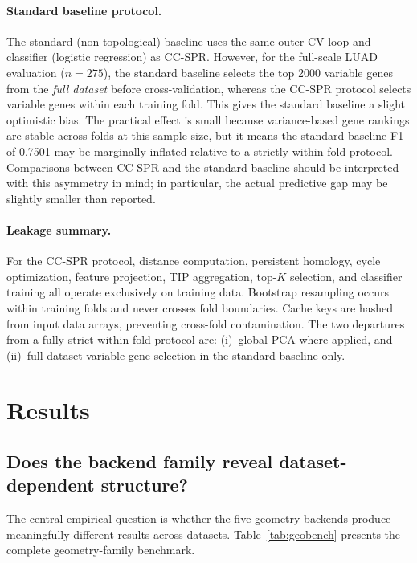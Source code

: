 \documentclass[11pt]{article}
\begin{document}
\paragraph{Standard baseline protocol.}
The standard (non-topological) baseline uses the same outer CV loop and classifier (logistic regression) as CC-SPR.
However, for the full-scale LUAD evaluation ($n = 275$), the standard baseline selects the top 2000 variable genes from the \emph{full dataset} before cross-validation, whereas the CC-SPR protocol selects variable genes within each training fold.
This gives the standard baseline a slight optimistic bias.
The practical effect is small because variance-based gene rankings are stable across folds at this sample size, but it means the standard baseline F1 of 0.7501 may be marginally inflated relative to a strictly within-fold protocol.
Comparisons between CC-SPR and the standard baseline should be interpreted with this asymmetry in mind; in particular, the actual predictive gap may be slightly smaller than reported.

\paragraph{Leakage summary.}
For the CC-SPR protocol, distance computation, persistent homology, cycle optimization, feature projection, TIP aggregation, top-$K$ selection, and classifier training all operate exclusively on training data.
Bootstrap resampling occurs within training folds and never crosses fold boundaries.
Cache keys are hashed from input data arrays, preventing cross-fold contamination.
The two departures from a fully strict within-fold protocol are: (i)~global PCA where applied, and (ii)~full-dataset variable-gene selection in the standard baseline only.

\section{Results}
\label{sec:results}

\subsection{Does the backend family reveal dataset-dependent structure?}

The central empirical question is whether the five geometry backends produce meaningfully different results across datasets.
Table~\ref{tab:geobench} presents the complete geometry-family benchmark.
\end{document}
